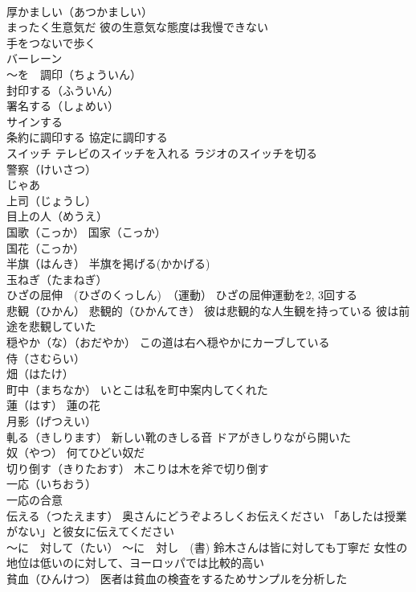 \documentclass[8pt]{extreport}
\begin{document}
\begin{CJK}{UTF8}{min}
\\	厚かましい（あつかましい）
\\	まったく生意気だ 彼の生意気な態度は我慢できない
\\	手をつないで歩く
\\	バーレーン
\\	～を　調印（ちょういん）　
\\	封印する（ふういん）
\\	署名する（しょめい）　
\\	サインする 
\\	条約に調印する 協定に調印する
\\	スイッチ テレビのスイッチを入れる ラジオのスイッチを切る
\\	警察（けいさつ）
\\	じゃあ
\\	上司（じょうし） 
\\	目上の人（めうえ）
\\	国歌（こっか） 国家（こっか）
\\	国花（こっか）
\\	半旗（はんき） 半旗を掲げる(かかげる)
\\	玉ねぎ（たまねぎ）
\\	ひざの屈伸　(ひざのくっしん)　（運動） ひざの屈伸運動を2, 3回する
\\	悲観（ひかん） 悲観的（ひかんてき） 彼は悲観的な人生観を持っている 彼は前途を悲観していた
\\	穏やか（な）（おだやか） この道は右へ穏やかにカーブしている
\\	侍（さむらい）
\\	畑（はたけ）
\\	町中（まちなか） いとこは私を町中案内してくれた
\\	蓮（はす） 蓮の花
\\	月影（げつえい）
\\	軋る（きしります） 新しい靴のきしる音 ドアがきしりながら開いた
\\	奴（やつ） 何てひどい奴だ
\\	切り倒す（きりたおす） 木こりは木を斧で切り倒す
\\	一応（いちおう） 
\\	一応の合意
\\	伝える（つたえます） 奥さんにどうぞよろしくお伝えください 「あしたは授業がない」と彼女に伝えてください
\\	～に　対して（たい） ～に　対し　(書) 鈴木さんは皆に対しても丁寧だ 女性の地位は低いのに対して、ヨーロッパでは比較的高い
\\	貧血（ひんけつ） 医者は貧血の検査をするためサンプルを分析した

\end{CJK}
\end{document}
